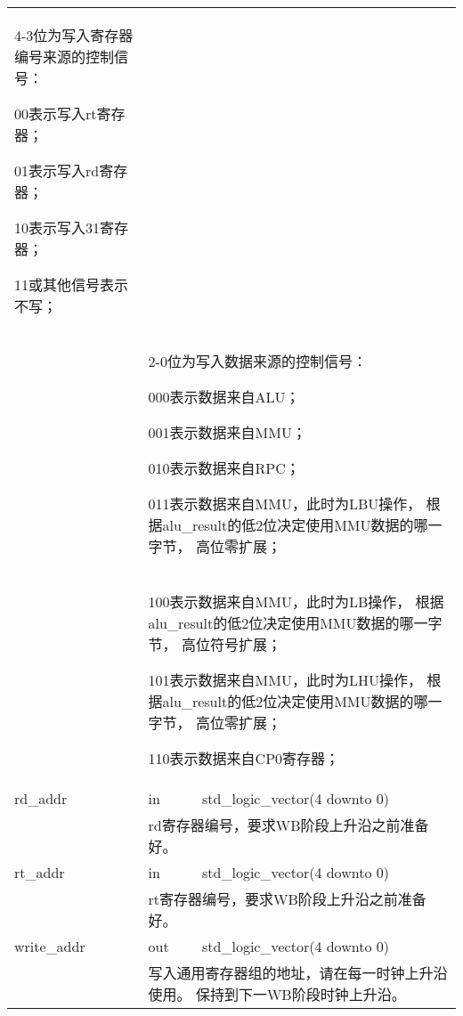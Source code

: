 \begin{tabularx}{\textwidth}{lll}
{                4-3位为写入寄存器编号来源的控制信号：

                    00表示写入rt寄存器；

                    01表示写入rd寄存器；

                    10表示写入31寄存器；

                    11或其他信号表示不写；
            } \\
            &
            \multicolumn{2}{X}{
                2-0位为写入数据来源的控制信号：

                    000表示数据来自ALU；

                    001表示数据来自MMU；

                    010表示数据来自RPC；

                    011表示数据来自MMU，此时为LBU操作，%
                    根据alu\_result的低2位决定使用MMU数据的哪一字节，%
                    高位零扩展；
            } \\
            &
            \multicolumn{2}{X}{
                    100表示数据来自MMU，此时为LB操作，%
                    根据alu\_result的低2位决定使用MMU数据的哪一字节，%
                    高位符号扩展；

                    101表示数据来自MMU，此时为LHU操作，%
                    根据alu\_result的低2位决定使用MMU数据的哪一字节，%
                    高位零扩展；

                    110表示数据来自CP0寄存器；
            } \\
            \midrule
            rd\_addr        & in    & std\_logic\_vector(4 downto 0) \\
            \cmidrule(l){2-3}
            &
            \multicolumn{2}{X}{
                rd寄存器编号，要求WB阶段上升沿之前准备好。
            } \\
            \midrule
            rt\_addr        & in    & std\_logic\_vector(4 downto 0) \\
            \cmidrule(l){2-3}
            &
            \multicolumn{2}{X}{
                rt寄存器编号，要求WB阶段上升沿之前准备好。
            } \\
            \midrule
            write\_addr     & out   & std\_logic\_vector(4 downto 0) \\
            \cmidrule(l){2-3}
            &
            \multicolumn{2}{X}{
                写入通用寄存器组的地址，请在每一时钟上升沿使用。%
                保持到下一WB阶段时钟上升沿。

}
\end{tabularx}
